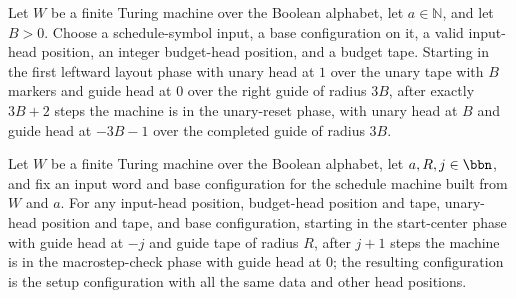 \begin{lemma}
\label{Complexity.setupCfg_layout_left}
\leanok
{}
Let $W$ be a finite Turing machine over the Boolean alphabet, let $a\in\mathbb{N}$, and
let $B>0$. Choose a schedule-symbol input, a base configuration on it, a valid
input-head position, an integer budget-head position, and a budget tape. Starting in the
first leftward layout phase with unary head at $1$ over the unary tape with $B$ markers
and guide head at $0$ over the right guide of radius $3B$, after exactly $3B+2$ steps
the machine is in the unary-reset phase, with unary head at $B$ and guide head at
$-3B-1$ over the completed guide of radius $3B$.
\end{lemma}

\begin{lemma}
\label{Complexity.setupCfg_start_center}
\leanok
{}
Let $W$ be a finite Turing machine over the Boolean alphabet, let $a,R,j\in\bbn$, and
fix an input word and base configuration for the schedule machine built from $W$ and
$a$. For any input-head position, budget-head position and tape, unary-head position and
tape, and base configuration, starting in the start-center phase with guide head at $-j$
and guide tape of radius $R$, after $j+1$ steps the machine is in the macrostep-check
phase with guide head at $0$; the resulting configuration is the setup configuration
with all the same data and other head positions.
\end{lemma}


